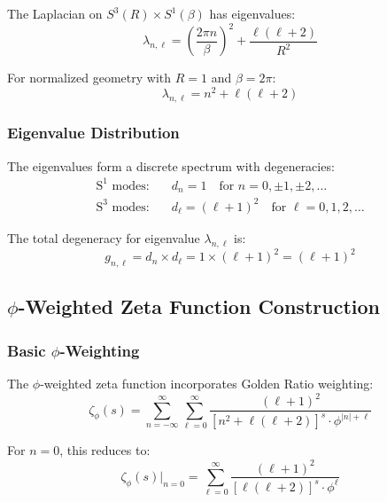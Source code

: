 The Laplacian on $S^3(R) \times S^1(\beta)$ has eigenvalues:
\begin{equation}
\lambda_{n,\ell} = \left(\frac{2\pi n}{\beta}\right)^2 + \frac{\ell(\ell+2)}{R^2}
\end{equation}

For normalized geometry with $R = 1$ and $\beta = 2\pi$:
\begin{equation}
\lambda_{n,\ell} = n^2 + \ell(\ell+2)
\end{equation}

\subsubsection{Eigenvalue Distribution}

The eigenvalues form a discrete spectrum with degeneracies:
\begin{align}
\text{S}^1 \text{ modes:} &\quad d_n = 1 \quad \text{for } n = 0, \pm 1, \pm 2, \ldots\\
\text{S}^3 \text{ modes:} &\quad d_\ell = (\ell+1)^2 \quad \text{for } \ell = 0, 1, 2, \ldots
\end{align}

The total degeneracy for eigenvalue $\lambda_{n,\ell}$ is:
\begin{equation}
g_{n,\ell} = d_n \times d_\ell = 1 \times (\ell+1)^2 = (\ell+1)^2
\end{equation}

\subsection{$\phi$-Weighted Zeta Function Construction}

\subsubsection{Basic $\phi$-Weighting}

The $\phi$-weighted zeta function incorporates Golden Ratio weighting:
\begin{equation}
\zeta_\phi(s) = \sum_{n=-\infty}^{\infty} \sum_{\ell=0}^{\infty} \frac{(\ell+1)^2}{[n^2 + \ell(\ell+2)]^s \cdot \phi^{|n|+\ell}}
\end{equation}

For $n = 0$, this reduces to:
\begin{equation}
\zeta_\phi(s)\big|_{n=0} = \sum_{\ell=0}^{\infty} \frac{(\ell+1)^2}{[\ell(\ell+2)]^s \cdot \phi^\ell}
\end{equation}

